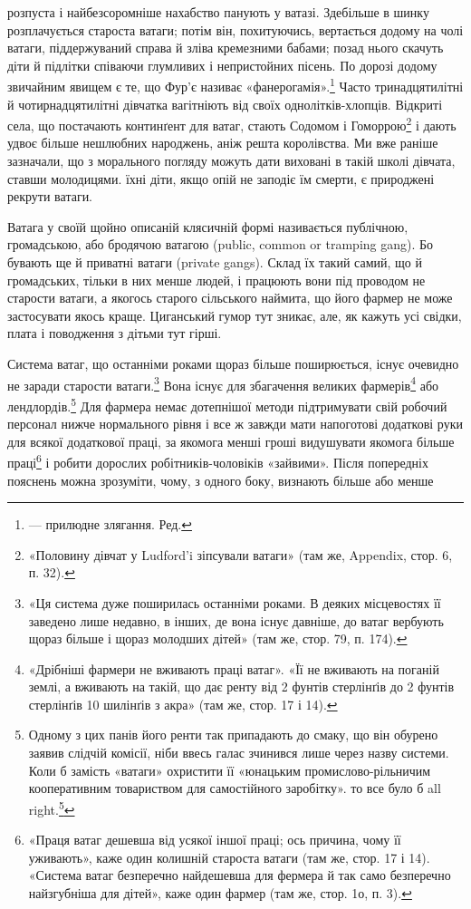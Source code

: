 розпуста і найбезсоромніше нахабство панують у ватазі. Здебільше
в шинку розплачується староста ватаги; потім він, похитуючись,
вертається додому на чолі ватаги, піддержуваний справа
й зліва кремезними бабами; позад нього скачуть діти й підлітки
співаючи глумливих і непристойних пісень. По дорозі додому звичайним
явищем є те, що Фур’є називає «фанерогамія».\footnote*{
— прилюдне злягання. Ред.
} Часто тринадцятилітні
й чотирнадцятилітні дівчатка вагітніють від своїх
однолітків-хлопців. Відкриті села, що постачають континґент
для ватаг, стають Содомом і Гоморрою\footnote{
«Половину дівчат у Ludford’i зіпсували ватаги» (там же, Appendix,
стор. 6, п. 32).
} і дають удвоє більше
нешлюбних народжень, аніж решта королівства. Ми вже раніше
зазначали, що з морального погляду можуть дати виховані в
такій школі дівчата, ставши молодицями. їхні діти, якщо опій
не заподіє їм смерти, є природжені рекрути ватаги.

Ватага у своїй щойно описаній клясичній формі називається
публічною, громадською, або бродячою ватагою (public, common
or tramping gang). Бо бувають ще й приватні ватаги (private
gangs). Склад їх такий самий, що й громадських, тільки в них
менше людей, і працюють вони під проводом не старости ватаги,
а якогось старого сільського наймита, що його фармер не може
застосувати якось краще. Циганський гумор тут зникає, але, як
кажуть усі свідки, плата і поводження з дітьми тут гірші.

Система ватаг, що останніми роками щораз більше поширюється,
існує очевидно не заради старости ватаги.\footnote{
«Ця система дуже поширилась останніми роками. В деяких місцевостях
її заведено лише недавно, в інших, де вона існує давніше, до ватаг
вербують щораз більше і щораз молодших дітей» (там же, стор. 79,
п. 174).
} Вона існує
для збагачення великих фармерів\footnote{
«Дрібніші фармери не вживають праці ватаг». «Її не вживають
на поганій землі, а вживають на такій, що дає ренту від 2 фунтів стерлінґів
до 2 фунтів стерлінґів 10 шилінґів з акра» (там же, стор. 17 і 14).
} або лендлордів.\footnote{
Одному з цих панів його ренти так припадають до смаку, що він
обурено заявив слідчій комісії, ніби ввесь галас зчинився лише через
назву системи. Коли б замість «ватаги» охристити її «юнацьким промислово-рільничим
кооперативним товариством для самостійного заробітку».
то все було б all right.\footnote*{
— гаразд. Ред.
}
} Для фармера
немає дотепнішої методи підтримувати свій робочий персонал
нижче нормального рівня і все ж завжди мати напоготові
додаткові руки для всякої додаткової праці, за якомога менші
гроші видушувати якомога більше праці\footnote{
«Праця ватаг дешевша від усякої іншої праці; ось причина, чому
її уживають», каже один колишній староста ватаги (там же, стор. 17
і 14). «Система ватаг безперечно найдешевша для фермера й так само
безперечно найзгубніша для дітей», каже один фармер (там же, стор. 1о,
п. 3).
} і робити дорослих
робітників-чоловіків «зайвими». Після попередніх пояснень
можна зрозуміти, чому, з одного боку, визнають більше або менше